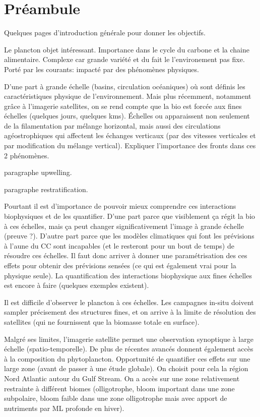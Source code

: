 \label{chp:introduction}

\minitoc%
\clearpage

\section{Préambule}

Quelques pages d'introduction générale pour donner les objectifs.

Le plancton objet intéressant.
Importance dans le cycle du carbone et la chaine alimentaire.
Complexe car grande variété et du fait le l'environement pas fixe.
Porté par les courants: impacté par des phénomènes physiques.

D'une part à grande échelle (basins, circulation océaniques) où sont définis les caractéristiques physique de l'environnement.
Mais plus récemment, notamment grâce à l'imagerie satellites, on se rend compte que la bio est forcée aux fines échelles (quelques jours, quelques kms). Échelles ou apparaissent non seulement de la filamentation par mélange horizontal, mais aussi des circulations agéostrophiques qui affectent les échanges verticaux (par des vitesses verticales et par modification du mélange vertical).
Expliquer l'importance des fronts dans ces 2 phénomènes.

paragraphe upwelling.

paragraphe restratification.

Pourtant il est d'importance de pouvoir mieux comprendre ces interactions biophysiques et de les quantifier.
D'une part parce que visiblement ça régit la bio à ces échelles, mais ça peut changer significativement l'image à grande échelle (preuve ?).
D'autre part parce que les modèles climatiques qui font les prévisions à l'aune du CC sont incapables (et le resteront pour un bout de temps) de résoudre ces échelles. Il faut donc arriver à donner une paramétrisation des ces effets pour obtenir des prévisions sensées (ce qui est également vrai pour la physique seule).
La quantification des interactions biophysique aux fines échelles est encore à faire (quelques exemples existent).

Il est difficile d'observer le plancton à ces échelles. Les campagnes in-situ doivent sampler précisement des structures fines, et on arrive à la limite de résolution des satellites (qui ne fournissent que la biomasse totale en surface).

Malgré ses limites, l'imagerie satellite permet une observation synoptique à large échelle (spatio-temporelle).
De plus de récentes avancés donnent également accès à la composition du phytoplancton.
Opportunité de quantifier ces effets sur une large zone (avant de passer à une étude globale).
On choisit pour cela la région Nord Atlantic autour du Gulf Stream. On a accès sur une zone relativement restrainte à différent biomes (olligotrophe, bloom important dans une zone subpolaire, bloom faible dans une zone olligotrophe mais avec apport de nutriments par ML profonde en hiver).

